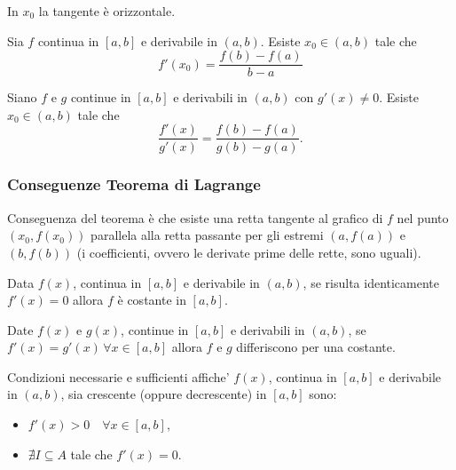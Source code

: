 \begin{remark}
    In $x_0$ la tangente è orizzontale.
\end{remark}

\begin{theorem}[Lagrange]
    Sia $f$ continua in $[a,b]$ e derivabile in $(a,b)$. Esiste $x_0\in(a,b)$ tale che
    \begin{equation*}
        f'(x_0)=\frac{f(b)-f(a)}{b-a}
    \end{equation*}
\end{theorem}

\begin{theorem}[Cauchy]
    Siano $f$ e $g$ continue in $[a,b]$ e derivabili in $(a,b)$ con $g'(x)\neq 0$. Esiste $x_0\in(a,b)$ tale che
    \begin{equation*}
        \frac{f'(x)}{g'(x)}=\frac{f(b)-f(a)}{g(b)-g(a)}.
    \end{equation*}
\end{theorem}

\subsubsection{Conseguenze Teorema di Lagrange}

\begin{remark}
    Conseguenza del teorema è che esiste una retta tangente al grafico di $f$ nel punto $(x_0, f(x_0))$ parallela alla retta passante per gli estremi $(a,f(a))$ e $(b, f(b))$ (i coefficienti, ovvero le derivate prime delle rette, sono uguali).
\end{remark}

\begin{theorem}
    Data $f(x)$, continua in $[a,b]$ e derivabile in $(a,b)$, se risulta identicamente $f'(x)=0$ allora $f$ è costante in $[a,b]$.
\end{theorem}

\begin{theorem}
    Date $f(x)$ e $g(x)$, continue in $[a,b]$ e derivabili in $(a,b)$, se $f'(x)=g'(x)\,\forall x\in[a,b]$ allora $f$ e $g$ differiscono per una costante. 
\end{theorem}

\begin{theorem}
    Condizioni necessarie e sufficienti affiche' $f(x)$, continua in $[a,b]$ e derivabile in $(a,b)$, sia crescente (oppure decrescente) in $[a,b]$ sono:
    \begin{itemize}
        \item $f'(x)> 0\quad \forall x\in[a,b]$,
        \item $\nexists I\subseteq A$ tale che $f'(x)=0$. 
    \end{itemize}
\end{theorem}



